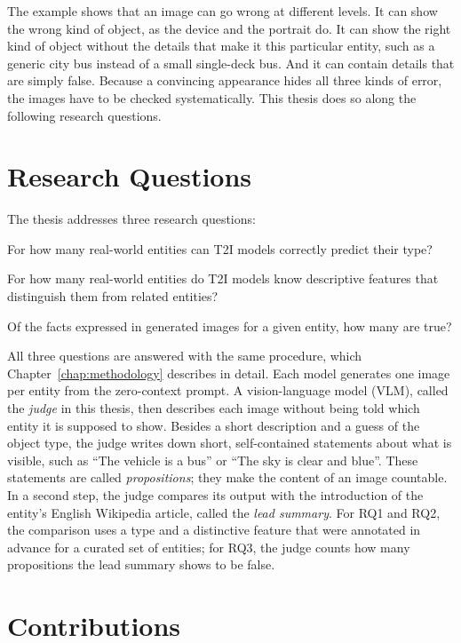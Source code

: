 The example shows that an image can go wrong at different levels. It can show
the wrong kind of object, as the device and the portrait do. It can show the
right kind of object without the details that make it this particular entity,
such as a generic city bus instead of a small single-deck bus. And it can
contain details that are simply false. Because a convincing appearance hides
all three kinds of error, the images have to be checked systematically. This
thesis does so along the following research questions.

\section{Research Questions}
\label{sec:rqs}

The thesis addresses three research questions:

\begin{description}[leftmargin=2.8cm,style=nextline]
\item[RQ1:] For how many real-world entities can T2I models correctly predict
their type?
\item[RQ2:] For how many real-world entities do T2I models know descriptive
features that distinguish them from related entities?
\item[RQ3:] Of the facts expressed in generated images for a given entity, how
many are true?
\end{description}

All three questions are answered with the same procedure, which
Chapter~\ref{chap:methodology} describes in detail. Each model generates one
image per entity from the zero-context prompt. A vision-language model (VLM),
called the \emph{judge} in this thesis, then describes each image without
being told which entity it is supposed to show. Besides a short description and
a guess of the object type, the judge writes down short, self-contained
statements about what is visible, such as ``The vehicle is a bus'' or ``The
sky is clear and blue''. These statements are called \emph{propositions}; they
make the content of an image countable. In a second step, the judge compares
its output with the introduction of the entity's English Wikipedia article,
called the \emph{lead summary}. For RQ1 and RQ2, the comparison uses a type and
a distinctive feature that were annotated in advance for a curated set of
entities; for RQ3, the judge counts how many propositions the lead summary
shows to be false.

\section{Contributions}

